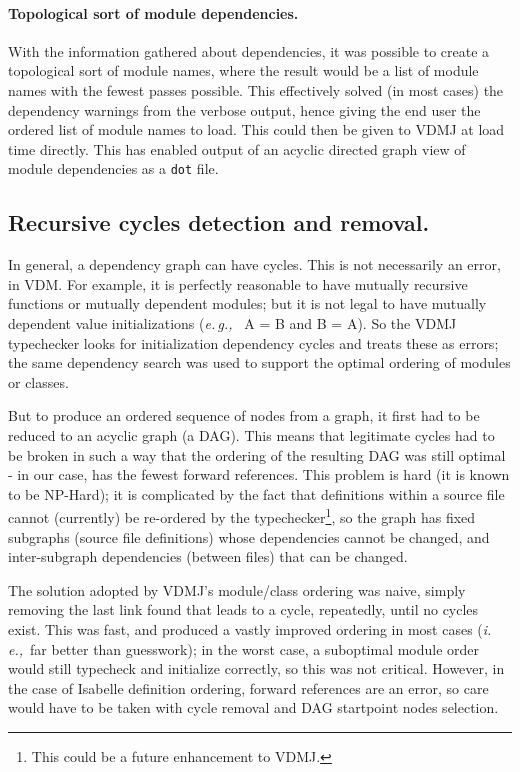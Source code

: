 \documentclass[runningheads,a4paper]{llncs}
\newcommand{\eg}{{\em e.\,g.,\/}}
\newcommand{\ie}{{\em i.\,e.,\/}}
\begin{document}
\paragraph*{Topological sort of module dependencies.}
%
With the information gathered about dependencies, it was possible to create a topological sort of module names, where the result would be a list of module names with the fewest passes possible. This effectively solved (in most cases) the dependency warnings from the verbose output, hence giving the end user the ordered list of module names to load. This could then be given to VDMJ at load time directly. This has enabled output of an acyclic directed graph view of module dependencies as a \texttt{dot} file.    

\subsection{Recursive cycles detection and removal.}

In general, a dependency graph can have cycles. This is not necessarily an error, in VDM. For example, it is perfectly reasonable to have mutually recursive functions or mutually dependent modules; but it is not legal to have mutually dependent value initializations (\eg~ A = B and B = A). So the VDMJ typechecker looks for initialization dependency cycles and treats these as errors; the same dependency search was used to support the optimal ordering of modules or classes.

But to produce an ordered sequence of nodes from a graph, it first had to be reduced to an acyclic graph (a DAG). This means that legitimate cycles had to be broken in such a way that the ordering of the resulting DAG was still optimal - in our case, has the fewest forward references. This problem is hard (it is known to be NP-Hard); it is complicated by the fact that definitions within a source file cannot (currently) be re-ordered by the typechecker\footnote{This could be a future enhancement to VDMJ.}, so the graph has fixed subgraphs (source file definitions) whose dependencies cannot be changed, and inter-subgraph dependencies (between files) that can be changed.

The solution adopted by VDMJ's module/class ordering was naive, simply removing the last link found that leads to a cycle, repeatedly, until no cycles exist. This was fast, and produced a vastly improved ordering in most cases (\ie~far better than guesswork); in the worst case, a suboptimal module order would still typecheck and initialize correctly, so this was not critical. However, in the case of Isabelle definition ordering, forward references are an error, so care would have to be taken with cycle removal and DAG startpoint nodes selection.
\end{document}
